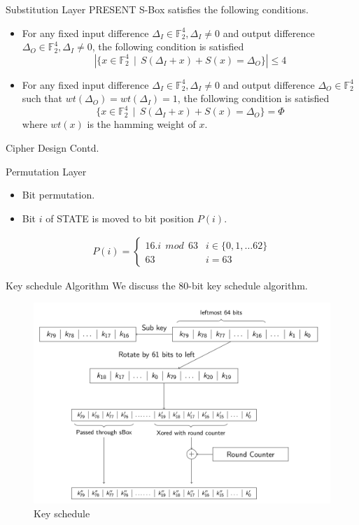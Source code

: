 \begin{frame}{Substitution Layer}
     PRESENT S-Box satisfies the following conditions.
    \begin{itemize}
        \item For any fixed input difference $\Delta_I \in \mathbb{F}_2^4,\Delta_I \not = 0$ and output difference $\Delta_O \in \mathbb{F}_2^4,\Delta_I \not = 0$, the following condition is satisfied
        \begin{equation*}
            |\{ x \in \mathbb{F}_2^4~~ \vert~~ S(\Delta_I +x) + S(x) = \Delta_O \}| \leq 4
        \end{equation*}
        \item For any fixed input difference $\Delta_I \in \mathbb{F}_2^4,\Delta_I \not = 0$ and output difference $\Delta_O \in \mathbb{F}_2^4$ such that $wt(\Delta_O) = wt(\Delta_I) = 1$, the following condition is satisfied
        \begin{equation*}
            \{ x \in \mathbb{F}_2^4~~ \vert~~  S(\Delta_I +x) + S(x) = \Delta_O  \} = \Phi
        \end{equation*}
        where $wt(x)$ is the hamming weight of $x$.
    \end{itemize}
\end{frame}

\begin{frame}{Cipher Design Contd.}
    \begin{block}{Permutation Layer}
        \begin{itemize}
            \item Bit permutation.
            \item Bit $i$ of \textsc{STATE} is moved to bit position $P(i)$.
        \end{itemize}
        \begin{eqnarray*}
         P(i) =  \begin{cases}
              16.i~~ mod~~ 63 & i \in \{0,1,\dots 62 \}\\
              63 & i = 63
           \end{cases}
        \end{eqnarray*}
    \end{block}
\end{frame}


\begin{frame}{Key schedule Algorithm}
We discuss the 80-bit key schedule algorithm.
 \begin{figure}[H]
	\centering
	\minipage{\textwidth}
	\includegraphics[width=\linewidth]{key.png}
	\endminipage
	\caption{Key schedule}
	\label{fig:key}
\end{figure}
\end{frame}
